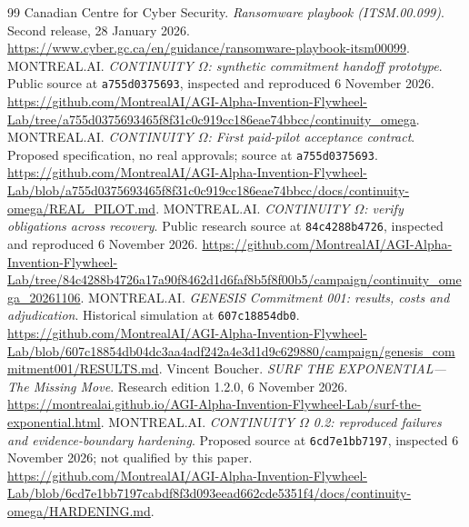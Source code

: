 \documentclass[11pt,a4paper]{article}
\begin{document}
\begin{thebibliography}{99}
 Canadian Centre for Cyber Security. \emph{Ransomware playbook (ITSM.00.099)}. Second release, 28 January 2026. \url{https://www.cyber.gc.ca/en/guidance/ransomware-playbook-itsm00099}.
 MONTREAL.AI. \emph{CONTINUITY $\Omega$: synthetic commitment handoff prototype}. Public source at \texttt{a755d0375693}, inspected and reproduced 6 November 2026. \url{https://github.com/MontrealAI/AGI-Alpha-Invention-Flywheel-Lab/tree/a755d0375693465f8f31c0c919cc186eae74bbcc/continuity_omega}.
 MONTREAL.AI. \emph{CONTINUITY $\Omega$: First paid-pilot acceptance contract}. Proposed specification, no real approvals; source at \texttt{a755d0375693}. \url{https://github.com/MontrealAI/AGI-Alpha-Invention-Flywheel-Lab/blob/a755d0375693465f8f31c0c919cc186eae74bbcc/docs/continuity-omega/REAL_PILOT.md}.
 MONTREAL.AI. \emph{CONTINUITY $\Omega$: verify obligations across recovery}. Public research source at \texttt{84c4288b4726}, inspected and reproduced 6 November 2026. \url{https://github.com/MontrealAI/AGI-Alpha-Invention-Flywheel-Lab/tree/84c4288b4726a17a90f8462d1d6faf8b5f8f00b5/campaign/continuity_omega_20261106}.
 MONTREAL.AI. \emph{GENESIS Commitment 001: results, costs and adjudication}. Historical simulation at \texttt{607c18854db0}. \url{https://github.com/MontrealAI/AGI-Alpha-Invention-Flywheel-Lab/blob/607c18854db04dc3aa4adf242a4e3d1d9c629880/campaign/genesis_commitment001/RESULTS.md}.
 Vincent Boucher. \emph{SURF THE EXPONENTIAL---The Missing Move}. Research edition 1.2.0, 6 November 2026. \url{https://montrealai.github.io/AGI-Alpha-Invention-Flywheel-Lab/surf-the-exponential.html}.
 MONTREAL.AI. \emph{CONTINUITY $\Omega$ 0.2: reproduced failures and evidence-boundary hardening}. Proposed source at \texttt{6cd7e1bb7197}, inspected 6 November 2026; not qualified by this paper. \url{https://github.com/MontrealAI/AGI-Alpha-Invention-Flywheel-Lab/blob/6cd7e1bb7197cabdf8f3d093eead662cde5351f4/docs/continuity-omega/HARDENING.md}.
\end{thebibliography}
\endgroup
\end{document}
